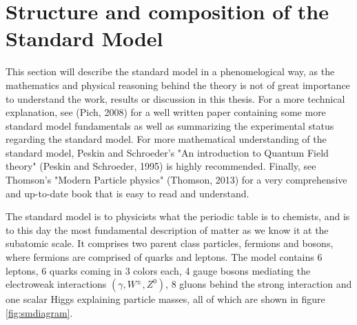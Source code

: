 \section{Structure and composition of the Standard Model}
This section will describe the standard model in a phenomelogical way, as the mathematics and 
physical reasoning behind the theory is not of great 
importance to understand the work, results or discussion in this thesis. For a more 
technical explanation, see (Pich, 2008)\cite{Pich:819632} for a 
well written paper containing some more standard model fundamentals as well as summarizing the 
experimental status regarding the standard model.
For more mathematical understanding of the standard model, Peskin and Schroeder's "An introduction 
to Quantum Field theory" (Peskin and Schroeder, 1995)\cite{Peskin:1995ev}
 is highly recommended. Finally, see Thomson's "Modern Particle physics" (Thomson, 2013)
 \cite{Thomson:2013zua} for a very comprehensive and up-to-date book that is easy to read and 
 understand. \par
The standard model is to physicists what the periodic table is to chemists, and is to this day the most fundamental description of matter as we know it at the subatomic scale. 
It comprises two parent class particles, fermions and bosons, where fermions are comprised of quarks and leptons. The model contains 
6 leptons, 6 quarks coming in 3 colors each, 4 gauge bosons mediating the electroweak interactions $(\gamma, W^{\pm}, Z^{0})$, 8 gluons behind the strong interaction and one 
scalar Higgs explaining particle masses, all of which are shown in figure \ref{fig:smdiagram}.



